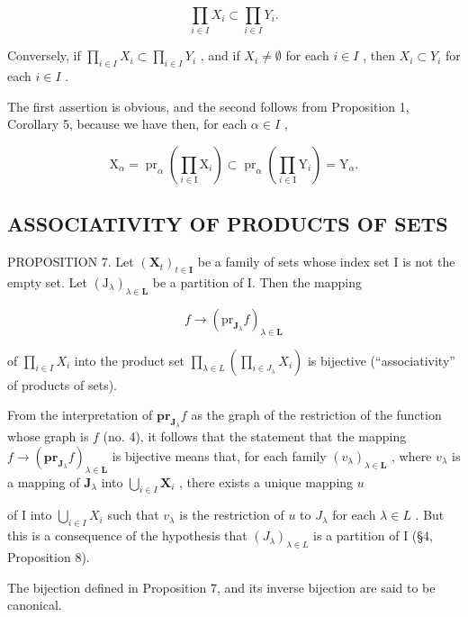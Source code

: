 \[
\prod_ {i \in I} X _ {i} \subset \prod_ {i \in I} Y _ {i}.
\]

Conversely, if \(\prod_{i\in I}X_i\subset \prod_{i\in I}Y_i\) , and if \(X_{i}\neq \emptyset\) for each \(i\in I\) , then \(X_{i}\subset Y_{i}\) for each \(i\in I\) .

The first assertion is obvious, and the second follows from Proposition 1, Corollary 5, because we have then, for each \(\alpha \in I\) ,

\[
\mathrm{X} _ {\alpha} = \operatorname{pr} _ {\alpha} \left(\prod_ {i \in \mathrm{I}} \mathrm{X} _ {i}\right) \subset \operatorname{pr} _ {\alpha} \left(\prod_ {i \in \mathrm{I}} \mathrm{Y} _ {i}\right) = \mathrm{Y} _ {\alpha}.
\]

\subsection{ASSOCIATIVITY OF PRODUCTS OF SETS}

PROPOSITION 7. Let \((\mathbf{X}_t)_{t \in \mathbf{I}}\) be a family of sets whose index set I is not the empty set. Let \((\mathrm{J}_{\lambda})_{\lambda \in \mathbf{L}}\) be a partition of I. Then the mapping

\[
f \rightarrow (\mathrm{pr} _ {\mathbf {J} _ {\lambda}} f) _ {\lambda \in \mathbf {L}}
\]

of \(\prod_{i\in I}X_i\) into the product set \(\prod_{\lambda \in L}\left(\prod_{i\in J_\lambda}X_i\right)\) is bijective (``associativity'' of products of sets).

From the interpretation of \(\mathbf{pr}_{\mathbf{J}_{\lambda}}f\) as the graph of the restriction of the function whose graph is \(f\) (no. 4), it follows that the statement that the mapping \(f \to (\mathbf{pr}_{\mathbf{J}_{\lambda}}f)_{\lambda \in \mathbf{L}}\) is bijective means that, for each family \((v_{\lambda})_{\lambda \in \mathbf{L}}\) , where \(v_{\lambda}\) is a mapping of \(\mathbf{J}_{\lambda}\) into \(\bigcup_{i\in I}\mathbf{X}_i\) , there exists a unique mapping \(u\)

of I into \(\bigcup_{i\in I}X_i\) such that \(v_{\lambda}\) is the restriction of \(u\) to \(J_{\lambda}\) for each \(\lambda\in L\) . But this is a consequence of the hypothesis that \((J_{\lambda})_{\lambda\in L}\) is a partition of I (§4, Proposition 8).

The bijection defined in Proposition 7, and its inverse bijection are said to be canonical.


